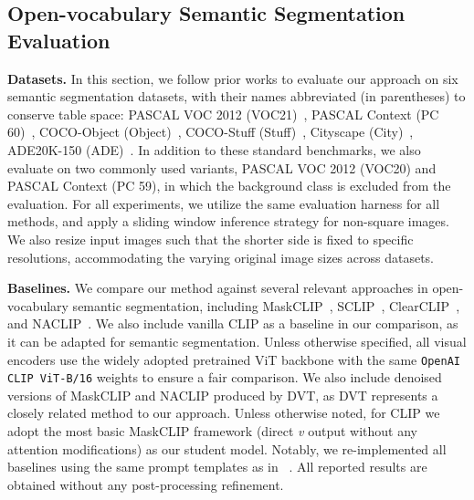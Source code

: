 \documentclass{article}
\begin{document}
\vspace{-.2cm}
\subsection{Open-vocabulary Semantic Segmentation Evaluation}
\label{section_seg}
\vspace{-.2cm}

\textbf{Datasets.} In this section, we follow prior works \citep{wang2024scliprethinkingselfattentiondense,hajimiri2025naclip,lan2024clearclip} to evaluate our approach on six semantic segmentation datasets, with their names abbreviated (in parentheses) to conserve table space: PASCAL VOC 2012 (VOC21)~\citep{everingham2015pascal}, PASCAL Context (PC 60)~\citep{context}, COCO-Object (Object)~\citep{cocoobjects}, COCO-Stuff (Stuff)~\citep{caesar2018coco}, Cityscape (City)~\citep{cordts2016cityscapes}, ADE20K-150 (ADE)~\citep{ade20k}. In addition to these standard benchmarks, we also evaluate on two commonly used variants, PASCAL VOC 2012 (VOC20) and PASCAL Context (PC 59), in which the background class is excluded from the evaluation. 
For all experiments, we utilize the same evaluation harness for all methods, and apply a sliding window inference strategy for non-square images. We also resize input images such that the shorter side is fixed to specific resolutions, accommodating the varying original image sizes across datasets. 

\textbf{Baselines.} We compare our method against several relevant approaches in open-vocabulary semantic segmentation, including MaskCLIP~\citep{zhou2022extract}, SCLIP~\citep{wang2024scliprethinkingselfattentiondense}, ClearCLIP~\citep{lan2024clearclip}, and NACLIP~\citep{hajimiri2025naclip}. We also include vanilla CLIP as a baseline in our comparison, as it can be adapted for semantic segmentation. Unless otherwise specified, all visual encoders use the widely adopted pretrained ViT backbone with the same \texttt{OpenAI CLIP ViT-B/16} weights to ensure a fair comparison. We also include denoised versions of MaskCLIP and NACLIP produced by DVT, as DVT represents a closely related method to our approach. Unless otherwise noted, for CLIP we adopt the most basic MaskCLIP framework (direct \textit{v} output without any attention modifications) as our student model.
Notably, we re-implemented all baselines using the same prompt templates as in ~\cite{wang2024scliprethinkingselfattentiondense, hajimiri2025naclip}. All reported results are obtained without any post-processing refinement. 
\end{document}
